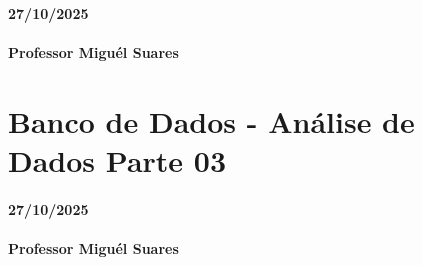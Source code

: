 \documentclass[
]{book}
\begin{document}
\subsubsection*{27/10/2025}\label{section-19}

\subsubsection*{Professor Miguél Suares}\label{professor-miguuxe9l-suares-19}

\chapter{Banco de Dados - Análise de Dados Parte 03}\label{banco-de-dados---anuxe1lise-de-dados-parte-03-1}

\subsubsection*{27/10/2025}\label{section-20}

\subsubsection*{Professor Miguél Suares}\label{professor-miguuxe9l-suares-20}

  
\end{document}
